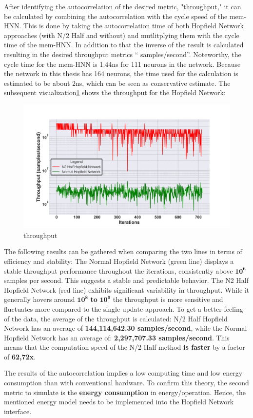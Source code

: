 After identifying the autocorrelation of the desired metric, "throughput," it can be calculated by combining the autocorrelation with the cycle speed of the \ac{mem-HNN}.
This is done by taking the autocorrelation time of both Hopfield Network approaches (with N/2 Half and without) and mutlitplying them with the cycle time of the \ac{mem-HNN}.
In addition to that the inverse of the result is calculated resulting in the desired throughput metrics `` samples/second''.
Noteworthy, the cycle time for the \ac{mem-HNN} is 1.44ns for 111 neurons in the network. 
Because the network in this thesis has 164 neurons, the time used for the calculation is estimated to be about 2ns, which can be seen as conservative estimate.
The subsequent visualization\ref{Throughput comparison} shows the throughput for the Hopfield Network:
\begin{figure}[H]
    \centering
    \includegraphics[width=0.9\linewidth]{graphics/Visualisierungen_throughput_log_2.png}
    \caption{throughput}
    \label{Throughput comparison}
\end{figure}
The following results can be gathered when comparing the two lines in terms of efficiency and stability:
The Normal Hopfield Network (green line) displays a stable throughput performance throughout the iterations, consistently above \(\mathbf{10^6}\)
samples per second. This suggests a stable and predictable behavior.
The N2 Half Hopfield Network (red line) exhibits significant variability in throughput. 
While it generally hovers around \(\mathbf{10^8}\) \textbf{to} \(\mathbf{10^9}\) the throughput is more sensitive and fluctuates more compared to the single update approach. 
To get a better feeling of the data, the average of the throughput is calculated: N/2 Half Hopfield Network has
an average of \textbf{144,114,642.30 samples/second}, while the
Normal Hopfield Network has an average of: \textbf{2,297,707.33 samples/second}. 
This means that the computation speed of the N/2 Half method \textbf{is faster} by a factor of \textbf{62,72x}.

The results of the autocorrelation implies a low computing time and low energy consumption than with conventional hardware.
To confirm this theory, the second metric to simulate is the \textbf{energy consumption} in energy/operation. 
Hence, the mentioned energy model needs to be implemented into the Hopfield Network interface. 
